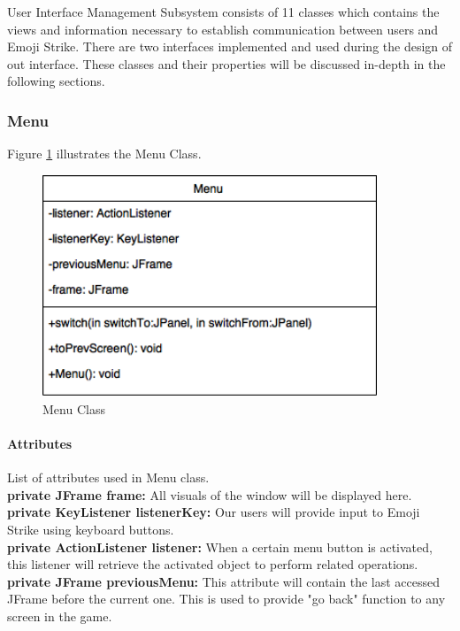 \documentclass[12pt]{article} %
\begin{document}
User Interface Management Subsystem consists of 11 classes which contains the views and information necessary to establish communication between users and Emoji Strike.  There are two interfaces implemented and used during the design of out interface.  These classes and their properties will be discussed in-depth in the following sections.

\subsubsection{Menu}

Figure \ref{fig:menu} illustrates the Menu Class.
\begin{figure}[h!]
   \centering
   \vspace{10pt}%
   \includegraphics[width=10cm]{menu.png}
   \caption{Menu Class}
   \label{fig:menu}
\end{figure}

\paragraph{Attributes \\}

List of attributes used in Menu class.\\
\textbf{private JFrame frame:} All visuals of the window will be displayed here.\\
\textbf{private KeyListener listenerKey:} Our users will provide input to Emoji Strike using keyboard buttons. \\
\textbf{private ActionListener listener:} When a certain menu button is activated, this listener will retrieve the activated object to perform related operations.\\
\textbf{private JFrame previousMenu:} This attribute will contain the last accessed JFrame before the current one.  This is used to provide "go back" function to any screen in the game.
\end{document}
